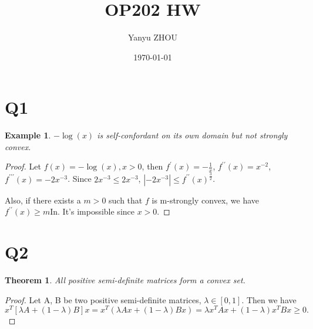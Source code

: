\documentclass[12pt]{article}
\title{OP202 HW}
\author{Yanyu ZHOU}
\date{\today}
\theoremstyle{mystyle}
\newtheorem{thm}[equation]{Theorem}
\newtheorem{example}[equation]{Example}
\begin{document}
\maketitle
\section{Q1}
\begin{example}
   $ -\log(x)$ is self-confordant on its own domain but not strongly convex.
\end{example}

\begin{proof}
    Let $f(x) = -\log(x), x >0$, then $f^\prime (x) = -\frac{1}{x}$, $f^{\prime \prime} (x) = x^{-2}$, $f^{\prime \prime \prime} (x) = -2x^{-3}$.
    Since $2x^{-3} \leq 2x^{-3}$, $|-2x^{-3}| \leq f^{\prime \prime} (x)^{\frac{3}{2}}$.

    Also, if there exists a $m > 0 $ such that $f$ is m-strongly convex, we have $f^{\prime \prime} (x) \geq m\text{In}$. It's impossible since $x>0$.
\end{proof}
\section{Q2}
\begin{thm}
All positive semi-definite matrices form a convex set.
\end{thm}

\begin{proof}
    Let A, B be two positive semi-definite matrices, $\lambda \in [0,1]$. Then we have
    $$x^T [\lambda A + (1-\lambda)B]x = x^T(\lambda Ax + (1-\lambda)Bx) = \lambda x^T Ax+ (1-\lambda)x^TBx \geq 0.$$
\end{proof}
\end{document}
